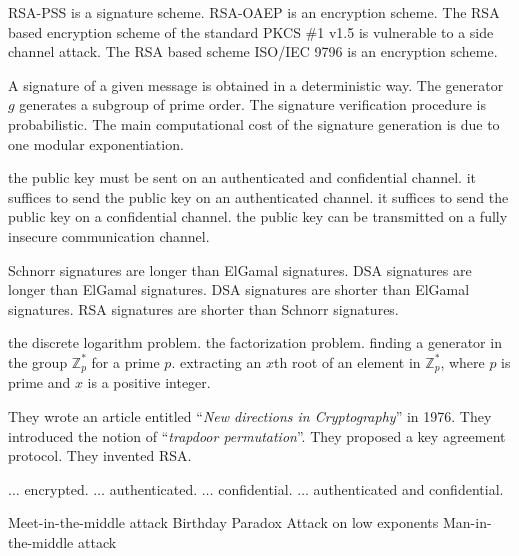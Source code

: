  {RSA-PSS is a signature scheme.} 
 {RSA-OAEP is an encryption scheme.} 
 {The RSA based encryption scheme of the standard PKCS \#1 v1.5 is
 vulnerable to a side channel attack.} 
 {The RSA based scheme ISO/IEC 9796 is an encryption scheme.} 
 
{A signature of a given message is obtained in a deterministic way.}
{The generator $g$ generates a subgroup of prime order.}
{The signature verification procedure is probabilistic.}
{The main computational cost of the signature generation is due to one modular
exponentiation.}

{the public key must be sent on an authenticated and confidential channel.}
{it suffices to send the public key on an authenticated channel.}
{it suffices to send the public key on a confidential channel.}
{the public key can be transmitted on a fully insecure communication channel.}

{Schnorr signatures are longer than ElGamal signatures.}
{DSA signatures are longer than ElGamal signatures.}
{DSA signatures are shorter than ElGamal signatures.}
{RSA signatures are shorter than Schnorr signatures.}

{the discrete logarithm problem.}
{the factorization problem.}
{finding a generator in the group $\mathbb{Z}_p^*$ for a prime $p$.}
{extracting an $x$th root of an element in $\mathbb{Z}_p^*$, where $p$ is
  prime and $x$ is a positive integer.}
  
  
 {They wrote an article entitled ``\emph{New directions in Cryptography}'' in 1976.}
 {They introduced the notion of ``\emph{trapdoor permutation}''.}
 {They proposed a key agreement protocol.}
 {They invented RSA.}  
  
 
{$ \dots $ encrypted.}
{$ \dots $ authenticated.}
{$ \dots $ confidential.}
{$ \dots $ authenticated and confidential.} 
 
{Meet-in-the-middle attack}
{Birthday Paradox}
{Attack on low exponents}
{Man-in-the-middle attack}


